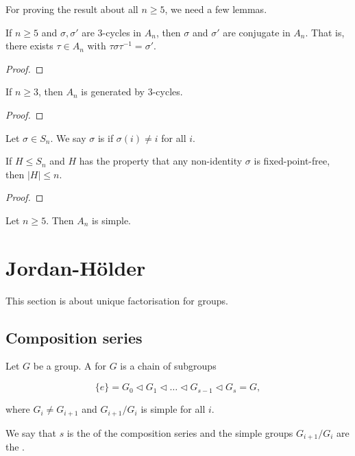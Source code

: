For proving the result about all \(n \geq 5\), we need a few lemmas.

\begin{lemma}
  If \(n \geq 5\) and \(\sigma, \sigma'\) are 3-cycles in \(A_{n}\), then \(\sigma\) and \(\sigma'\) are conjugate in \(A_{n}\). That is, there exists \(\tau \in A_{n}\) with \(\tau \sigma \tau^{-1} = \sigma'\).
\end{lemma}

\begin{proof}
\end{proof}

\begin{lemma}
  If \(n \geq 3\), then \(A_{n}\) is generated by 3-cycles.
\end{lemma}

\begin{proof}
\end{proof}

\begin{definition}
  Let \(\sigma \in S_{n}\). We say \(\sigma\) is  if \(\sigma(i) \neq i\) for all \(i\).
\end{definition}

\begin{lemma}
  If \(H \leq S_{n}\) and \(H\) has the property that any non-identity \(\sigma\) is fixed-point-free, then \(|H| \leq n\).
\end{lemma}

\begin{proof}
\end{proof}

\begin{theorem}
  Let \(n \geq 5\). Then \(A_{n}\) is simple.
\end{theorem}


\section{Jordan-H\"older}
This section is about unique factorisation for groups.

\subsection{Composition series}

\begin{definition}\label{def:group-theory:composition-series}
  Let \(G\) be a group. A  for \(G\) is a chain of subgroups

  \[\{e\} = G_{0} \triangleleft G_{1} \triangleleft \ldots \triangleleft G_{s-1} \triangleleft G_{s} = G,\]

  where \(G_{i} \neq G_{i+1}\) and \(G_{i+1}/G_{i}\) is simple for all \(i\).

  We say that \(s\) is the  of the composition series and the simple groups \(G_{i+1} / G_{i}\) are the .
\end{definition}

